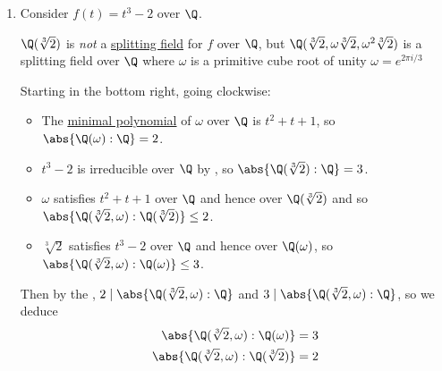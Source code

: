 \documentclass{article}
\begin{document}
\begin{eg}
    \leavevmode
    \begin{enumerate}
        \item Consider $f(t) = t^3 - 2$ over $\Q$.

            $\Q(\sqrt[3]{2})$ is \emph{not} a \hyperlink{def:splitting}{splitting field} for $f$ over $\Q$, but $\Q(\sqrt[3]{2}, \omega\sqrt[3]{2}, \omega^2\sqrt[3]{2})$ is a splitting field over $\Q$ where $\omega$ is a primitive cube root of unity $\omega = e^{2\pi i/3}$
            \begin{center}
            \end{center}

            Starting in the bottom right, going clockwise:
            \begin{itemize}
                \item The \hyperlink{def:minimalPoly}{minimal polynomial} of $\omega$ over $\Q$ is $t^2 + t + 1$, so $\abs{\Q(\omega):\Q}=2$.
                \item $t^3 - 2$ is irreducible over $\Q$ by , so $\abs{\Q(\sqrt[3]{2}):\Q}=3$.
                \item $\omega$ satisfies $t^2 + t + 1$ over $\Q$ and hence over $\Q(\sqrt[3]{2})$ and so $\abs{\Q(\sqrt[3]{2}, \omega):\Q(\sqrt[3]{2})} \leq 2$.
                \item $\sqrt[3]{2}$ satisfies $t^3 - 2$ over $\Q$ and hence over $\Q(\omega)$, so $\abs{\Q(\sqrt[3]{2}, \omega):\Q(\omega)} \leq 3$.
            \end{itemize}

            Then by the , $2 \mid \abs{\Q(\sqrt[3]{2}, \omega): \Q}$ and $3 \mid \abs{\Q(\sqrt[3]{2}, \omega): \Q}$, so we deduce
            \begin{align*}
                \abs{\Q(\sqrt[3]{2}, \omega) : \Q(\omega)} = 3 \\
                \abs{\Q(\sqrt[3]{2}, \omega) : \Q(\sqrt[3]{2})} = 2
            \end{align*}


\end{enumerate}
\end{eg}
\end{document}
